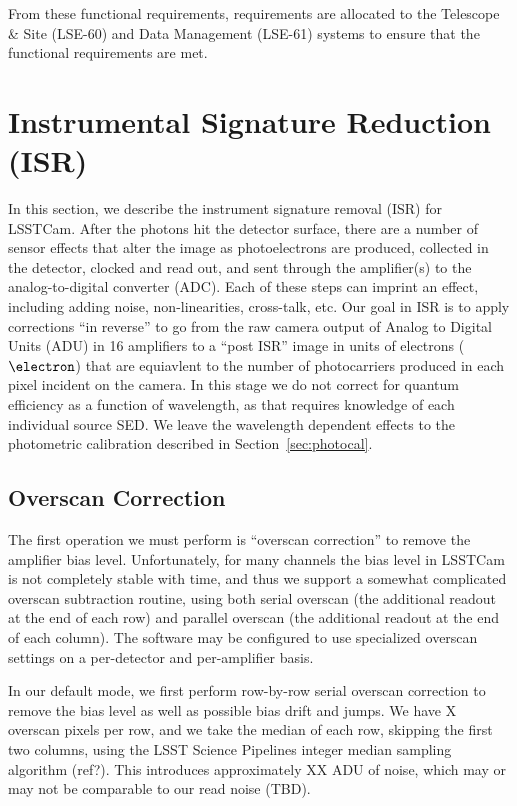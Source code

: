 \documentclass[SE,authoryear,lsstdraft,toc]{lsstdoc}
\begin{document}
From these functional requirements, requirements are allocated to the Telescope
\& Site (LSE-60) and Data Management (LSE-61) systems to ensure that the
functional requirements are met.

\section{Instrumental Signature Reduction (ISR)}

In this section, we describe the instrument signature removal (ISR) for
LSSTCam.  After the photons hit the detector surface, there are a number of
sensor effects that alter the image as photoelectrons are produced, collected
in the detector, clocked and read out, and sent through the amplifier(s) to the
analog-to-digital converter (ADC).  Each of these steps can imprint an effect,
including adding noise, non-linearities, cross-talk, etc.  Our goal in ISR is
to apply corrections ``in reverse'' to go from the raw camera output of Analog
to Digital Units (ADU) in 16 amplifiers to a ``post ISR'' image in units of
electrons ($\electron$) that are equiavlent to the number of photocarriers
produced in each pixel incident on the camera.  In this stage we do not correct
for quantum efficiency as a function of wavelength, as that requires knowledge
of each individual source SED.  We leave the wavelength dependent effects to
the photometric calibration described in Section~\ref{sec:photocal}.


\subsection{Overscan Correction}

The first operation we must perform is ``overscan correction'' to remove the
amplifier bias level.  Unfortunately, for many channels the bias level in
LSSTCam is not completely stable with time, and thus we support a somewhat
complicated overscan subtraction routine, using both serial overscan (the
additional readout at the end of each row) and parallel overscan (the
additional readout at the end of each column).  The software may be configured
to use specialized overscan settings on a per-detector and per-amplifier basis.

In our default mode, we first perform row-by-row serial overscan correction to
remove the bias level as well as possible bias drift and jumps.  We have X
overscan pixels per row, and we take the median of each row, skipping the first
two columns, using the LSST Science Pipelines integer median sampling algorithm
(ref?).  This introduces approximately XX ADU of noise, which may or may not be
comparable to our read noise (TBD).
\end{document}

